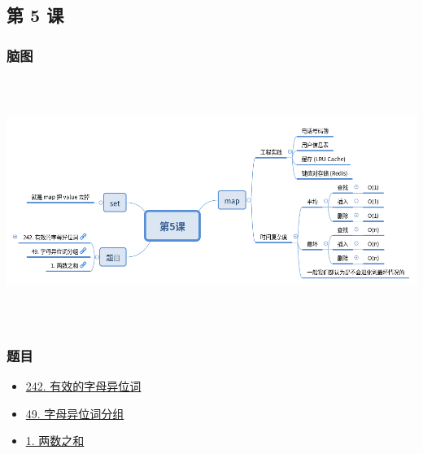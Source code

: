 \subsection{第 5 课}

\subsubsection{脑图}

\includegraphics[width=170mm,height=80mm]{images/第5课.png}

\subsubsection{题目}

\begin{itemize}
\item \hyperref[leetcode:242]{242. 有效的字母异位词}
\item \hyperref[leetcode:49]{49. 字母异位词分组}
\item \hyperref[leetcode:1]{1. 两数之和}
\end{itemize}
